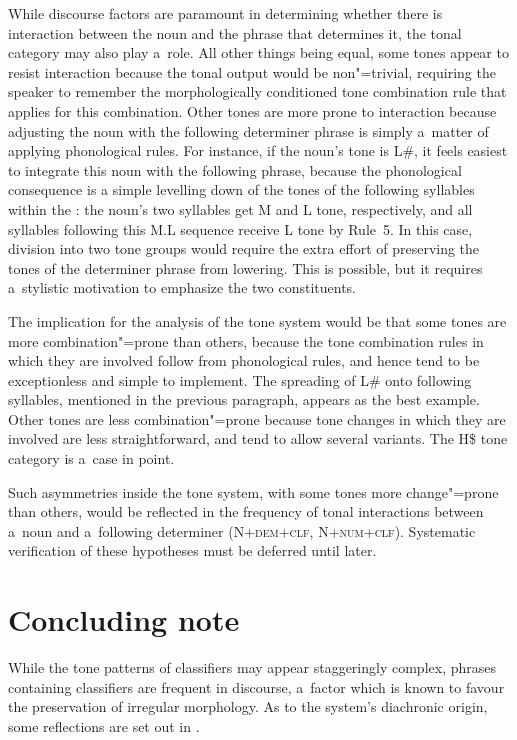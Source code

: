 While discourse factors are paramount in determining whether there is interaction between the noun and the phrase that determines it, the tonal category may also play a~role. All other things being equal, some
tones appear to resist interaction because the tonal output would be non"=trivial, requiring the speaker to remember the morphologically conditioned tone combination rule that applies for this combination. Other tones are more prone to interaction because adjusting the noun with the following determiner phrase is simply a~matter of applying phonological rules. For instance, if the noun's tone is L\#, it feels easiest to integrate this noun with the following phrase, because the phonological consequence is a simple levelling down of the tones of the following syllables within the : the noun's two syllables get M and L tone, respectively, and all syllables following this M.L sequence receive L tone by Rule~5. In this case, division into two tone groups would require the extra effort of preserving the tones of the determiner phrase from lowering. This is possible, but it
requires a~stylistic motivation to emphasize the two constituents. 

The implication for the analysis of the tone system would be that some tones are more combination"=prone than others, because the tone combination rules in which they are involved follow from phonological rules, and hence tend to be exceptionless and simple to implement. The spreading of L\# onto following syllables, mentioned in the previous paragraph, appears as the best example. Other tones are less combination"=prone because tone changes in which they are involved are less straightforward,
and tend to allow several variants. The H\$ tone category is a~case in point. 

Such asymmetries inside the tone system, with some tones more change"=prone than others, would
be reflected in the frequency of tonal interactions between a~noun and a~following determiner
(N+\textsc{dem}+\textsc{clf}, N+\textsc{num}+\textsc{clf}). Systematic verification of these hypotheses must be deferred until later.

\largerpage[-2]
\section[Concluding note]{Concluding note}
\label{sec:generalconclusion}

While the tone patterns of classifiers may appear staggeringly complex, phrases containing classifiers are frequent in discourse, a~factor which is known to favour the preservation of irregular morphology. As to the system's {diachronic} origin, some reflections are set out in . 

